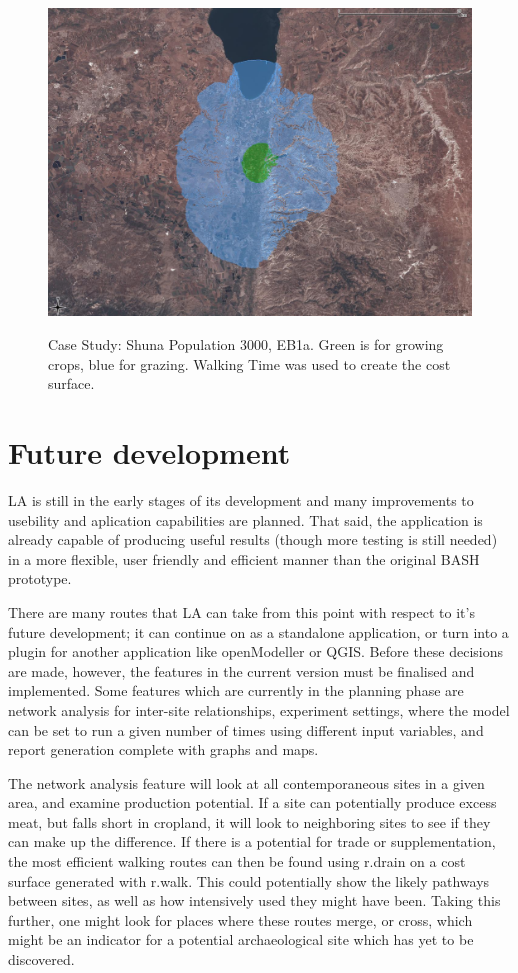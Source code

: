   \begin{figure}[htbp] %
  \includegraphics[scale=0.225]{./images/LEB130007030FallowSlope.jpg}
  \label{fig:caseStudy} \caption{Case Study: Shuna  Population 3000, EB1a.  Green is for growing crops, blue for grazing.  Walking Time was used to create the cost surface.}
  \end{figure}

\section{Future development} \label{FuturePlans} 

LA is still in the early stages of its development and many
improvements to usebility and aplication capabilities are planned. That said,
the application is already capable of producing useful results (though more
testing is still needed) in a more flexible, user friendly and efficient manner
than the original BASH prototype.

There are many routes that LA can take from this point with
respect to it's future development; it can continue on as a standalone
application, or turn into a plugin for another application like openModeller or
QGIS.  Before these decisions are made, however, the features in the current
version must be finalised and implemented.  Some features which are currently
in the planning phase are network analysis  for inter-site relationships,
experiment settings, where the model can be set to run a given number of times
using different input variables, and report generation complete with graphs and
maps. 

The network analysis feature will look at all contemporaneous sites in a given
area, and examine production potential.  If a site can potentially produce
excess meat, but falls short in cropland, it will look to neighboring sites to
see if they can make up the difference.  If there is a potential for trade or
supplementation, the most efficient walking routes can then be found using
r.drain on a cost surface generated with r.walk.  This could potentially show
the likely pathways between sites, as well as how intensively used they might
have been.  Taking this further, one might look for places where these routes
merge, or cross, which might be an indicator for a potential archaeological
site which has yet to be discovered.

